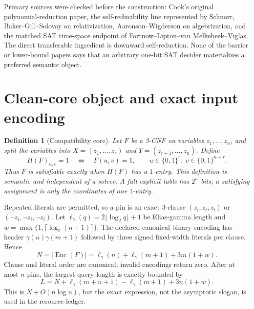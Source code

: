 \documentclass[11pt]{article}
\newtheorem{definition}{Definition}
\newcommand{\Enc}{\operatorname{Enc}}
\begin{document}
Primary sources were checked before the construction: Cook's original
polynomial-reduction paper, the self-reducibility line represented by
Schnorr, Baker--Gill--Solovay on relativization, Aaronson--Wigderson on
algebrization, and the matched SAT time-space endpoint of
Fortnow--Lipton--van Melkebeek--Viglas.  The direct transferable ingredient
is downward self-reduction.  None of the barrier or lower-bound papers says
that an arbitrary one-bit SAT decider materializes a preferred semantic
object.

\section{Clean-core object and exact input encoding}
\begin{definition}[Compatibility core]
Let $F$ be a 3-CNF on variables $z_1,\ldots,z_n$, and split the variables
into $X=(z_1,\ldots,z_r)$ and $Y=(z_{r+1},\ldots,z_n)$.  Define
\[
 H(F)_{u,v}=1 \quad\Longleftrightarrow\quad F(u,v)=1,
 \qquad
 u\in\{0,1\}^{r},\ v\in\{0,1\}^{n-r}.
\]
Thus $F$ is satisfiable exactly when $H(F)$ has a $1$-entry.  This definition
is semantic and independent of a solver.  A full explicit table has $2^n$
bits; a satisfying assignment is only the coordinates of one $1$-entry.
\end{definition}

Repeated literals are permitted, so a pin is an exact 3-clause
$(z_i,z_i,z_i)$ or $(\neg z_i,\neg z_i,\neg z_i)$.  Let
\(\ell_\gamma(q)=2\lfloor\log_2q\rfloor+1\) be Elias-gamma length and
\(w=\max\{1,\lceil\log_2(n+1)\rceil\}\).  The declared canonical binary
encoding has header $\gamma(n)\gamma(m+1)$ followed by three signed
fixed-width literals per clause.  Hence
\[
 N=|\Enc(F)|=\ell_\gamma(n)+\ell_\gamma(m+1)+3m(1+w).       \tag{1}
\]
Clause and literal order are canonical; invalid encodings return zero.
After at most $n$ pins, the largest query length is exactly bounded by
\[
 L=N+\ell_\gamma(m+n+1)-\ell_\gamma(m+1)+3n(1+w).          \tag{2}
\]
This is $N+O(n\log n)$, but the exact expression, not the asymptotic slogan,
is used in the resource ledger.
\end{document}
